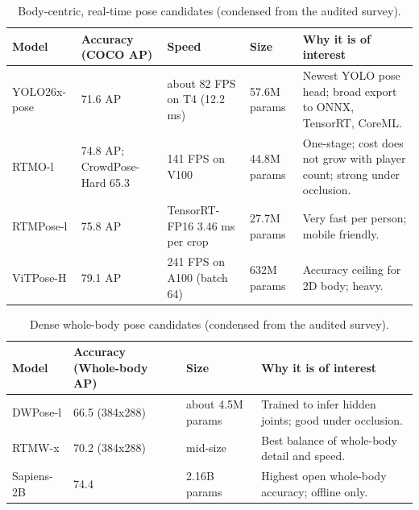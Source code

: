 \documentclass[oneside,openany]{book}
\begin{document}
\begin{table}[!h]
	\begin{center}
		\caption{Body-centric, real-time pose candidates (condensed from the audited survey).}
		\label{tab:bodymodels}
		\footnotesize
		\begin{tabular}{p{2.6cm}p{2.4cm}p{3.0cm}p{1.8cm}p{3.2cm}}
			\toprule
			\textbf{Model} & \textbf{Accuracy (COCO AP)} & \textbf{Speed} & \textbf{Size} &
			\textbf{Why it is of interest} \\
			\midrule
			YOLO26x-pose \cite{ultralytics_pose} & 71.6 AP & about 82 FPS on T4 (12.2 ms) & 57.6M
			params & Newest YOLO pose head; broad export to ONNX, TensorRT, CoreML. \\
			RTMO-l \cite{lu2023rtmo} & 74.8 AP; CrowdPose-Hard 65.3 & 141 FPS on V100 & 44.8M
			params & One-stage; cost does not grow with player count; strong under occlusion. \\
			RTMPose-l \cite{jiang2023rtmpose} & 75.8 AP & TensorRT-FP16 3.46 ms per crop & 27.7M
			params & Very fast per person; mobile friendly. \\
			ViTPose-H \cite{xu2022vitpose} & 79.1 AP & 241 FPS on A100 (batch 64) & 632M params &
			Accuracy ceiling for 2D body; heavy. \\
			\bottomrule
		\end{tabular}
	\end{center}
\end{table}

\begin{table}[!h]
	\begin{center}
		\caption{Dense whole-body pose candidates (condensed from the audited survey).}
		\label{tab:wbmodels}
		\footnotesize
		\begin{tabular}{p{2.6cm}p{3.4cm}p{2.2cm}p{4.6cm}}
			\toprule
			\textbf{Model} & \textbf{Accuracy (Whole-body AP)} & \textbf{Size} &
			\textbf{Why it is of interest} \\
			\midrule
			DWPose-l \cite{yang2023dwpose} & 66.5 (384x288) & about 4.5M params & Trained to infer
			hidden joints; good under occlusion. \\
			RTMW-x \cite{jiang2024rtmw} & 70.2 (384x288) & mid-size & Best balance of whole-body
			detail and speed. \\
			Sapiens-2B \cite{khirodkar2024sapiens} & 74.4 & 2.16B params & Highest open whole-body
			accuracy; offline only. \\
			\bottomrule
		\end{tabular}
	\end{center}
\end{table}
\end{document}
